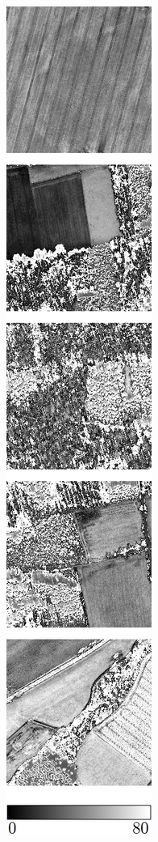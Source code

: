 \begin{figure}[h]
\begin{subfigure}{\VegetationImageWidth}
        \caption{}
        \label{fig:svi_savi}
    \end{subfigure} \hspace{2mm}
    \begin{subfigure}{\VegetationImageWidth}
        \includegraphics[width=\textwidth]{images/vegetation/msavi}
        \caption{}
        \label{fig:svi_msavi}
    \end{subfigure}


\end{figure}
